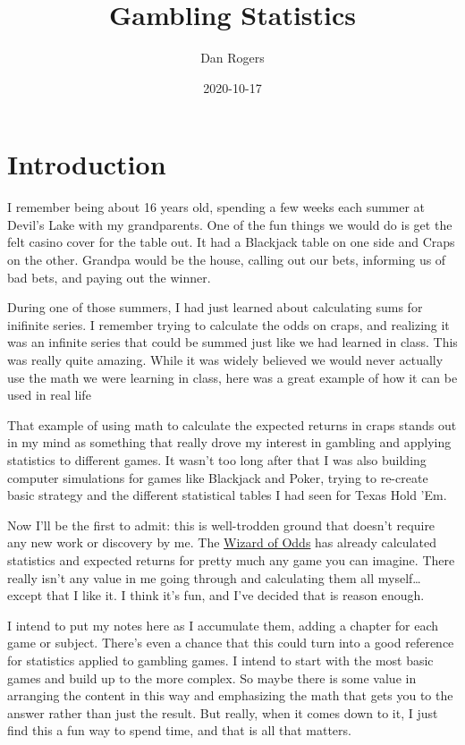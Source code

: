 \documentclass[
]{book}
\title{Gambling Statistics}
\author{Dan Rogers}
\date{2020-10-17}
\begin{document}
\maketitle

{
\setcounter{tocdepth}{1}
\tableofcontents
}
\hypertarget{introduction}{%
\chapter*{Introduction}\label{introduction}}

I remember being about 16 years old, spending a few weeks each summer at Devil's Lake with my grandparents. One of the fun things we would do is get the felt casino cover for the table out. It had a Blackjack table on one side and Craps on the other. Grandpa would be the house, calling out our bets, informing us of bad bets, and paying out the winner.

During one of those summers, I had just learned about calculating sums for inifinite series. I remember trying to calculate the odds on craps, and realizing it was an infinite series that could be summed just like we had learned in class. This was really quite amazing. While it was widely believed we would never actually use the math we were learning in class, here was a great example of how it can be used in real life

That example of using math to calculate the expected returns in craps stands out in my mind as something that really drove my interest in gambling and applying statistics to different games. It wasn't too long after that I was also building computer simulations for games like Blackjack and Poker, trying to re-create basic strategy and the different statistical tables I had seen for Texas Hold 'Em.

Now I'll be the first to admit: this is well-trodden ground that doesn't require any new work or discovery by me. The \href{https://wizardofodds.com/}{Wizard of Odds} has already calculated statistics and expected returns for pretty much any game you can imagine. There really isn't any value in me going through and calculating them all myself\ldots{} except that I like it. I think it's fun, and I've decided that is reason enough.

I intend to put my notes here as I accumulate them, adding a chapter for each game or subject. There's even a chance that this could turn into a good reference for statistics applied to gambling games. I intend to start with the most basic games and build up to the more complex. So maybe there is some value in arranging the content in this way and emphasizing the math that gets you to the answer rather than just the result. But really, when it comes down to it, I just find this a fun way to spend time, and that is all that matters.
\end{document}
